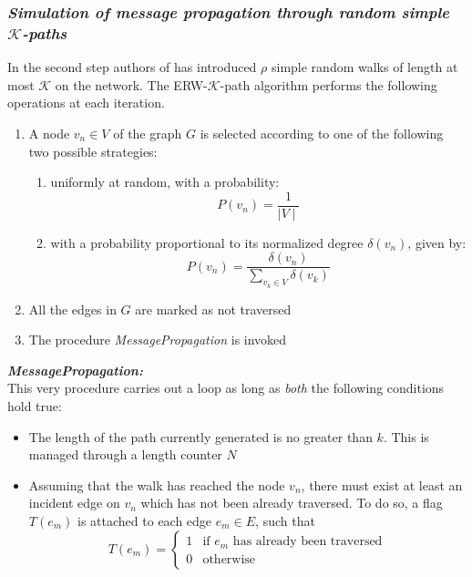 {\subsubsection*{\textit{Simulation of message propagation through random simple $\mathcal{K}$-paths}}
In the second step authors of \cite{ref-35} has introduced $\rho$ simple random walks of length at most $\mathcal{K}$ on the network. The ERW-$\mathcal{K}$-path algorithm performs the following operations at each iteration.
\begin{enumerate}
	\item A node $v_n \in V$ of the graph $G$ is selected according to one of the following two possible strategies:
	\begin{enumerate}[label=\alph*.]
		\item uniformly at random, with a probability:
		\begin{equation}
		P(v_n) = \dfrac{1}{\mid V \mid}
		\end{equation}
		\item with a probability proportional to its normalized degree $\delta(v_n)$, given by:
		\begin{equation}\label{probability-of-normalized-degree}
		P(v_n) = \dfrac{\delta(v_n)}{\sum_{v_k \in V} \delta(v_k)}
		\end{equation}
	\end{enumerate}
	\item All the edges in $G$ are marked as not traversed
	\item The procedure \textit{MessagePropagation} is invoked
\end{enumerate}
\textbf{\textit{MessagePropagation:}}\\
This very procedure carries out a loop as long as \textit{both} the following conditions hold true:
\begin{itemize}
	\item The length of the path currently generated is no greater than $k$. This is managed through a length counter $N$
	\item Assuming that the walk has reached the node $v_n$, there must exist at least an incident edge on $v_n$ which has not been already traversed. To do so, a flag $T(e_m)$ is attached to each edge $e_m \in E$, such that
	\begin{equation}
	T(e_m) = \begin{cases}
	1 & \text{if $e_m$ has already been traversed}\\
	0 & \text{otherwise}
	\end{cases} 

\end{equation}
\end{itemize}}

